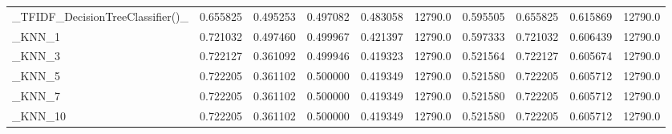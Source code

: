 \begin{tabular}{lrrrrrrrrr}
\_TFIDF\_DecisionTreeClassifier()\_                   &  0.655825 &         0.495253 &      0.497082 &        0.483058 &        12790.0 &            0.595505 &         0.655825 &           0.615869 &           12790.0 \\
\_KNN\_1                                             &  0.721032 &         0.497460 &      0.499967 &        0.421397 &        12790.0 &            0.597333 &         0.721032 &           0.606439 &           12790.0 \\
\_KNN\_3                                             &  0.722127 &         0.361092 &      0.499946 &        0.419323 &        12790.0 &            0.521564 &         0.722127 &           0.605674 &           12790.0 \\
\_KNN\_5                                             &  0.722205 &         0.361102 &      0.500000 &        0.419349 &        12790.0 &            0.521580 &         0.722205 &           0.605712 &           12790.0 \\
\_KNN\_7                                             &  0.722205 &         0.361102 &      0.500000 &        0.419349 &        12790.0 &            0.521580 &         0.722205 &           0.605712 &           12790.0 \\
\_KNN\_10                                            &  0.722205 &         0.361102 &      0.500000 &        0.419349 &        12790.0 &            0.521580 &         0.722205 &           0.605712 &           12790.0 \\
\bottomrule
\end{tabular}
